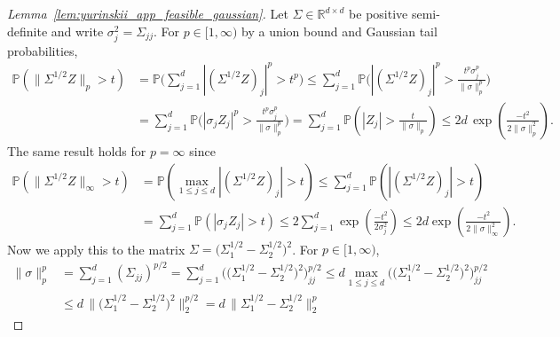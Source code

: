 \documentclass[11pt,lof]{puthesis}
\renewcommand{\P}{\ensuremath{\mathbb{P}}}
\newcommand{\R}{\ensuremath{\mathbb{R}}}
\theoremstyle{break}
\theoremstyle{proof}
\newtheorem{proof}{Proof}
\begin{document}
\begin{proof}[Lemma~\ref{lem:yurinskii_app_feasible_gaussian}]

  Let $\Sigma \in \R^{d \times d}$ be positive semi-definite
  and write $\sigma^2_j = \Sigma_{j j} $.
  For $p \in [1, \infty)$ by a union bound and
  Gaussian tail probabilities,
  \begin{align*}
    \P\left(\big\| \Sigma^{1/2} Z \big\|_p > t \right)
    &=
    \P\Bigg(
      \sum_{j=1}^d
      \left|
      \left(
        \Sigma^{1/2} Z
      \right)_j
      \right|^p
    > t^p \Bigg)
    \leq
    \sum_{j=1}^d
    \P\Bigg(
      \left|
      \left(
        \Sigma^{1/2} Z
      \right)_j
      \right|^p
      > \frac{t^p \sigma_j^p}{\|\sigma\|_p^p}
    \Bigg) \\
    &=
    \sum_{j=1}^d
    \P\Bigg(
      \left|
      \sigma_j Z_j
      \right|^p
      > \frac{t^p \sigma_j^p}{\|\sigma\|_p^p}
    \Bigg)
    =
    \sum_{j=1}^d
    \P\left(
      \left| Z_j \right|
      > \frac{t}{\|\sigma\|_p}
    \right)
    \leq
    2 d \, \exp\left( \frac{-t^2}{2 \|\sigma\|_p^2} \right).
  \end{align*}
  The same result holds for $p = \infty$ since
  \begin{align*}
    \P\left(\big\| \Sigma^{1/2} Z \big\|_\infty > t \right)
    &=
    \P\left(
      \max_{1 \leq j \leq d}
      \left|
      \left(
        \Sigma^{1/2} Z
      \right)_j
      \right|
    > t \right)
    \leq
    \sum_{j=1}^d
    \P\left(
      \left|
      \left(
        \Sigma^{1/2} Z
      \right)_j
      \right|
      > t
    \right) \\
    &=
    \sum_{j=1}^d
    \P\left(
      \left|
      \sigma_j Z_j
      \right|
      > t
    \right)
    \leq
    2 \sum_{j=1}^d
    \exp\left( \frac{-t^2}{2 \sigma_j^2} \right)
    \leq
    2 d
    \exp\left( \frac{-t^2}{2 \|\sigma\|_\infty^2} \right).
  \end{align*}
  Now we apply this to the matrix
  $\Sigma = \big(\Sigma_1^{1/2} - \Sigma_2^{1/2}\big)^2$.
  For $p \in [1, \infty)$,
  \begin{align*}
    \|\sigma\|_p^p
    &=
    \sum_{j=1}^d (\Sigma_{j j})^{p/2}
    =
    \sum_{j=1}^d
    \Big(\big(\Sigma_1^{1/2} - \Sigma_2^{1/2}\big)^2\Big)_{j j}^{p/2}
    \leq
    d \max_{1 \leq j \leq d}
    \Big(\big(\Sigma_1^{1/2} - \Sigma_2^{1/2}\big)^2\Big)_{j j}^{p/2} \\
    &\leq
    d \, \Big\|\big(\Sigma_1^{1/2} - \Sigma_2^{1/2}\big)^2\Big\|_2^{p/2}
    =
    d \, \big\|\Sigma_1^{1/2} - \Sigma_2^{1/2}\big\|_2^p

\end{align*}
\end{proof}
\end{document}
